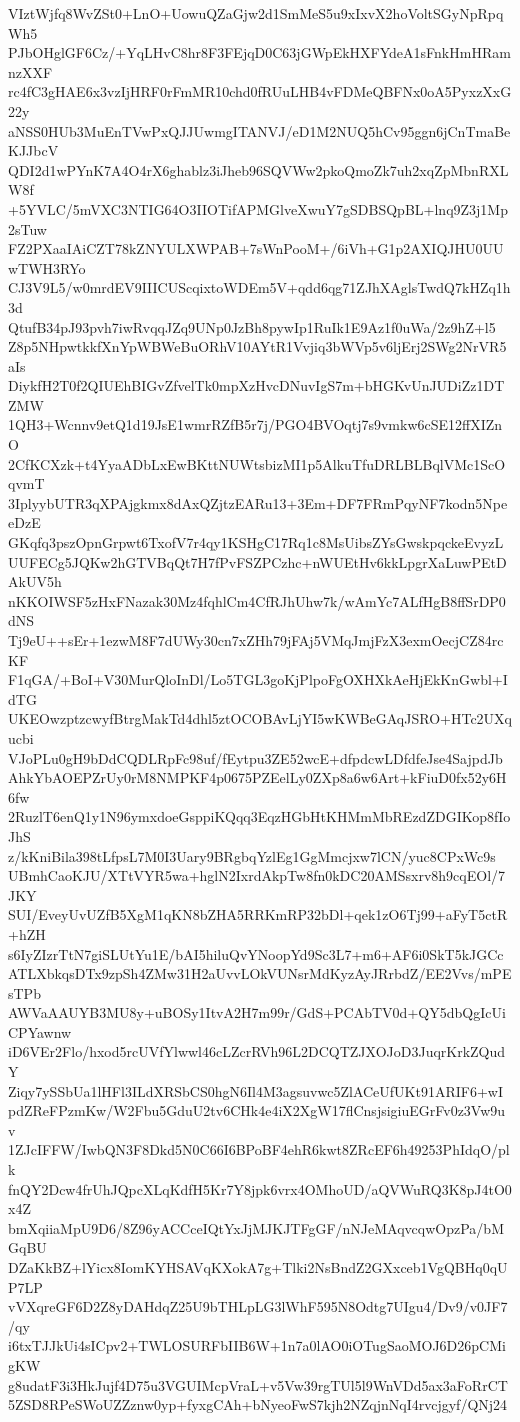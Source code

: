 VIztWjfq8WvZSt0+LnO+UowuQZaGjw2d1SmMeS5u9xIxvX2hoVoltSGyNpRpqWh5
PJbOHglGF6Cz/+YqLHvC8hr8F3FEjqD0C63jGWpEkHXFYdeA1sFnkHmHRamnzXXF
rc4fC3gHAE6x3vzIjHRF0rFmMR10chd0fRUuLHB4vFDMeQBFNx0oA5PyxzXxG22y
aNSS0HUb3MuEnTVwPxQJJUwmgITANVJ/eD1M2NUQ5hCv95ggn6jCnTmaBeKJJbcV
QDI2d1wPYnK7A4O4rX6ghablz3iJheb96SQVWw2pkoQmoZk7uh2xqZpMbnRXLW8f
+5YVLC/5mVXC3NTIG64O3IIOTifAPMGlveXwuY7gSDBSQpBL+lnq9Z3j1Mp2sTuw
FZ2PXaaIAiCZT78kZNYULXWPAB+7sWnPooM+/6iVh+G1p2AXIQJHU0UUwTWH3RYo
CJ3V9L5/w0mrdEV9IIICUScqixtoWDEm5V+qdd6qg71ZJhXAglsTwdQ7kHZq1h3d
QtufB34pJ93pvh7iwRvqqJZq9UNp0JzBh8pywIp1RuIk1E9Az1f0uWa/2z9hZ+l5
Z8p5NHpwtkkfXnYpWBWeBuORhV10AYtR1Vvjiq3bWVp5v6ljErj2SWg2NrVR5aIs
DiykfH2T0f2QIUEhBIGvZfvelTk0mpXzHvcDNuvIgS7m+bHGKvUnJUDiZz1DTZMW
1QH3+Wcnnv9etQ1d19JsE1wmrRZfB5r7j/PGO4BVOqtj7s9vmkw6cSE12ffXIZnO
2CfKCXzk+t4YyaADbLxEwBKttNUWtsbizMI1p5AlkuTfuDRLBLBqlVMc1ScOqvmT
3IplyybUTR3qXPAjgkmx8dAxQZjtzEARu13+3Em+DF7FRmPqyNF7kodn5NpeeDzE
GKqfq3pszOpnGrpwt6TxofV7r4qy1KSHgC17Rq1c8MsUibsZYsGwskpqckeEvyzL
UUFECg5JQKw2hGTVBqQt7H7fPvFSZPCzhc+nWUEtHv6kkLpgrXaLuwPEtDAkUV5h
nKKOIWSF5zHxFNazak30Mz4fqhlCm4CfRJhUhw7k/wAmYc7ALfHgB8ffSrDP0dNS
Tj9eU++sEr+1ezwM8F7dUWy30cn7xZHh79jFAj5VMqJmjFzX3exmOecjCZ84rcKF
F1qGA/+BoI+V30MurQloInDl/Lo5TGL3goKjPlpoFgOXHXkAeHjEkKnGwbl+IdTG
UKEOwzptzcwyfBtrgMakTd4dhl5ztOCOBAvLjYI5wKWBeGAqJSRO+HTc2UXqucbi
VJoPLu0gH9bDdCQDLRpFc98uf/fEytpu3ZE52wcE+dfpdcwLDfdfeJse4SajpdJb
AhkYbAOEPZrUy0rM8NMPKF4p0675PZEelLy0ZXp8a6w6Art+kFiuD0fx52y6H6fw
2RuzlT6enQ1y1N96ymxdoeGsppiKQqq3EqzHGbHtKHMmMbREzdZDGIKop8fIoJhS
z/kKniBila398tLfpsL7M0I3Uary9BRgbqYzlEg1GgMmcjxw7lCN/yuc8CPxWc9s
UBmhCaoKJU/XTtVYR5wa+hglN2IxrdAkpTw8fn0kDC20AMSsxrv8h9cqEOl/7JKY
SUI/EveyUvUZfB5XgM1qKN8bZHA5RRKmRP32bDl+qek1zO6Tj99+aFyT5ctR+hZH
s6IyZIzrTtN7giSLUtYu1E/bAI5hiluQvYNoopYd9Sc3L7+m6+AF6i0SkT5kJGCc
ATLXbkqsDTx9zpSh4ZMw31H2aUvvLOkVUNsrMdKyzAyJRrbdZ/EE2Vvs/mPEsTPb
AWVaAAUYB3MU8y+uBOSy1ItvA2H7m99r/GdS+PCAbTV0d+QY5dbQgIcUiCPYawnw
iD6VEr2Flo/hxod5rcUVfYlwwl46cLZcrRVh96L2DCQTZJXOJoD3JuqrKrkZQudY
Ziqy7ySSbUa1lHFl3ILdXRSbCS0hgN6Il4M3agsuvwc5ZlACeUfUKt91ARIF6+wI
pdZReFPzmKw/W2Fbu5GduU2tv6CHk4e4iX2XgW17flCnsjsigiuEGrFv0z3Vw9uv
1ZJcIFFW/IwbQN3F8Dkd5N0C66I6BPoBF4ehR6kwt8ZRcEF6h49253PhIdqO/plk
fnQY2Dcw4frUhJQpcXLqKdfH5Kr7Y8jpk6vrx4OMhoUD/aQVWuRQ3K8pJ4tO0x4Z
bmXqiiaMpU9D6/8Z96yACCceIQtYxJjMJKJTFgGF/nNJeMAqvcqwOpzPa/bMGqBU
DZaKkBZ+lYicx8IomKYHSAVqKXokA7g+Tlki2NsBndZ2GXxceb1VgQBHq0qUP7LP
vVXqreGF6D2Z8yDAHdqZ25U9bTHLpLG3lWhF595N8Odtg7UIgu4/Dv9/v0JF7/qy
i6txTJJkUi4sICpv2+TWLOSURFbIIB6W+1n7a0lAO0iOTugSaoMOJ6D26pCMigKW
g8udatF3i3HkJujf4D75u3VGUIMcpVraL+v5Vw39rgTUl5l9WnVDd5ax3aFoRrCT
5ZSD8RPeSWoUZZznw0yp+fyxgCAh+bNyeoFwS7kjh2NZqjnNqI4rvcjgyf/QNj24
